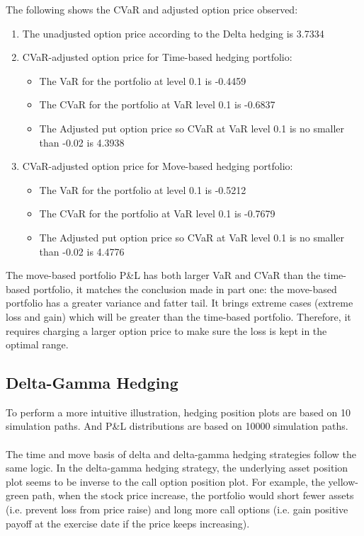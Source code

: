 \documentclass[12pt]{article}
\begin{document}
The following shows the CVaR and adjusted option price observed: 
\begin{enumerate}

  \item The unadjusted option price according to the Delta hedging is 3.7334
  \item CVaR-adjusted option price for Time-based hedging portfolio:

  \begin{itemize}

    \item The VaR for the portfolio at level 0.1 is -0.4459
    \item The CVaR for the portfolio at VaR level 0.1 is -0.6837
    \item The Adjusted put option price so CVaR at VaR level 0.1 is no smaller than -0.02 is 4.3938

  \end{itemize}

  \item CVaR-adjusted option price for Move-based hedging portfolio:
  
  \begin{itemize}

    \item The VaR for the portfolio at level 0.1 is -0.5212
    \item The CVaR for the portfolio at VaR level 0.1 is -0.7679
    \item The Adjusted put option price so CVaR at VaR level 0.1 is no smaller than -0.02 is 4.4776

  \end{itemize}

\end{enumerate}

\noindent
The move-based portfolio P\&L has both larger VaR and CVaR than the time-based portfolio, it matches the conclusion made in part one: the move-based portfolio has a greater variance and fatter tail. It brings extreme cases (extreme loss and gain) which will be greater than the 
time-based portfolio. Therefore, it requires charging a larger option price to make sure the loss is kept in the optimal range.

\subsection{Delta-Gamma Hedging}
To perform a more intuitive illustration, hedging position plots are based on 10 simulation paths. And P\&L distributions are based on 10000 simulation paths. 
\\\\
The time and move basis of delta and delta-gamma hedging strategies follow the same logic. In the delta-gamma hedging strategy, the underlying asset position plot seems to be inverse to the call option position plot. For example, the yellow-green path, when the stock price increase, 
the portfolio would short fewer assets (i.e. prevent loss from price raise) and long more call options (i.e. gain positive payoff at the exercise date if the price keeps increasing).
\end{document}
